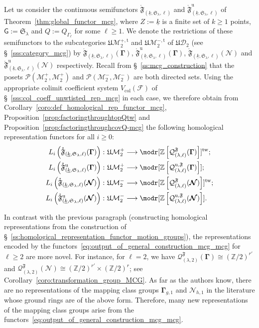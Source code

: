 \documentclass[AHL,Unicode,published]{cedram}
\newcommand{\Int}{\mathring}
\newcommand{\tw}{\mathrm{tw}}
\newcommand{\mt}{\mathrm{t}}
\newcommand{\col}{\mathrm{col}}
\newcommand{\unt}{\mathrm{u}}
\newcommand{\MCGo}{\mathbf{\Gamma}}
\newcommand{\MCGno}{\boldsymbol{\mathcal{N}}}
\newcommand{\LCS}{\varGamma}
\newcommand{\Sym}{\mathfrak{S}}
\newcommand{\fF}{\mathfrak{F}}
\newcommand{\fU}{\ensuremath{\mathfrak{U}}}
\newcommand{\sF}{\mathscr{F}}
\newcommand{\sG}{\mathsf{G}}
\newcommand{\cD}{\mathcal{D}}
\newcommand{\cM}{\mathcal{M}}
\newcommand{\cP}{\mathcal{P}}
\newcommand{\cQ}{\mathcal{Q}}
\newcommand{\bZ}{\mathbb{Z}}
\newcommand{\too}{\ensuremath{\longrightarrow}}
\renewcommand{\geq}{\geqslant}
\begin{document}
Let us consider the continuous semifunctors $\Int{\fF}_{(\underline{k},\Sym_{\lambda},\ell)}$ and $\Int{\fF}^{\unt}_{(\underline{k},\Sym_{\lambda},\ell)}$ of Theorem~\ref{thm:global_functor_mcg}, where $Z:=\underline{k}$ is a finite set of $k\geq 1$ points, $\sG:=\Sym_{\lambda}$ and $Q:=Q_{\LCS_{\ell}}$ for some $\ell\geq 1$. We denote the restrictions of these semifunctors to the subcategories $\fU\cM_{2}^{+,\mt}$ and $\fU\cM_{2}^{-,\mt}$ of $\fU\cD_{2}$ (see \S~\ref{sss:category_mcg}) by $\Int{\fF}_{(\underline{k},\Sym_{\lambda},\ell)}(\MCGo)$, $\Int{\fF}^{\unt}_{(\underline{k},\Sym_{\lambda},\ell)}(\MCGo)$, $\Int{\fF}_{(\underline{k},\Sym_{\lambda},\ell)}(\MCGno)$ and $\Int{\fF}^{\unt}_{(\underline{k},\Sym_{\lambda},\ell)}(\MCGno)$ respectively. Recall from \S~\ref{ss:mcg_construction} that the posets $\cP(\cM_{2}^{+},\cM_{2}^{+})$ and $\cP(\cM_{2}^{-},\cM_{2}^{-})$ are both directed sets. Using the appropriate colimit coefficient system $V_{\col}(\sF)$ of \S~\ref{sss:col_coeff_unwtisted_rep_mcg} in each case, we therefore obtain from Corollary~\ref{coro:def_homological_rep_functor_mcg}, Proposition~\ref{prop:factoringthroughtopQtw} and Proposition~\ref{prop:factoringthroughcovQ-mcg} the following homological representation functors for all $i\geq 0$:
\begin{equation}\label{eq:output_of_general_construction_mcg_mcg}
\begin{split}
L_{i}\left(\Int{\fF}_{\left(\underline{k},\Sym_{\lambda},\ell\right)}(\MCGo)\right) \colon \fU\cM_{2}^{+} &\too \modr[\bZ\left[\cQ^{\fF}_{(\lambda,\ell)}(\MCGo)\right]]^{\tw}; \\
L_{i}\left(\Int{\fF}^{\unt}_{\left(\underline{k},\Sym_{\lambda},\ell\right)}(\MCGo)\right) \colon \fU\cM_{2}^{+} &\too \modr[\bZ\left[\cQ^{\unt,\fF}_{(\lambda,\ell)}(\MCGo)\right]]; \\
L_{i}\left(\Int{\fF}_{\left(\underline{k},\Sym_{\lambda},\ell\right)}(\MCGno)\right) \colon \fU\cM_{2}^{-} &\too \modr[\bZ\left[\cQ^{\fF}_{(\lambda,\ell)}(\MCGno)\right]]^{\tw}; \\
L_{i}\left(\Int{\fF}^{\unt}_{\left(\underline{k},\Sym_{\lambda},\ell\right)}(\MCGno)\right) \colon \fU\cM_{2}^{-} &\too \modr[\bZ\left[\cQ^{\unt,\fF}_{(\lambda,\ell)}(\MCGno)\right]].
\end{split}
\end{equation}

In contrast with the previous paragraph (constructing homological representations from the construction of \S~\ref{ss:homological_representation_functor_motion_groups}), the representations encoded by the functors~\eqref{eq:output_of_general_construction_mcg_mcg} for $\ell\geq 2$ are more novel. For instance, for $\ell = 2$, we have $\cQ^{\fF}_{(\lambda,2)}(\MCGo)\cong (\bZ/2)^{r'}$ and $\cQ^{\fF}_{(\lambda,2)}(\MCGno)\cong (\bZ/2)^{r'}\times(\bZ/2)^{r}$; see Corollary~\ref{coro:transformation_group_MCG}. As far as the authors know, there are no representations of the mapping class groups $\MCGo_{g,1}$ and $\MCGno_{h,1}$ in the literature whose ground rings are of the above form. Therefore, many new representations of the mapping class groups arise from the functors~\eqref{eq:output_of_general_construction_mcg_mcg}.
\end{document}

